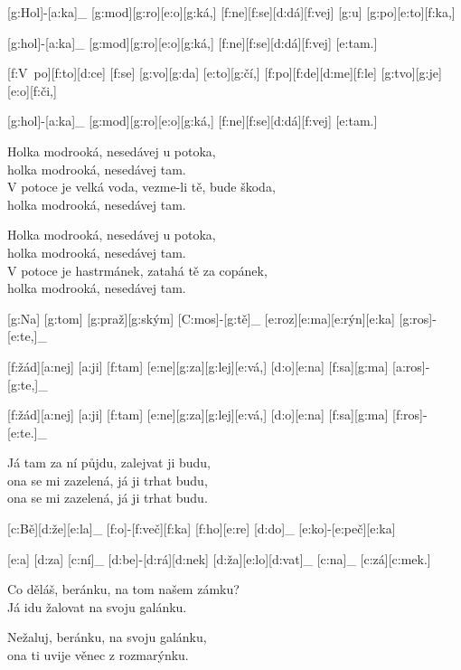 
[g:Hol]-[a:ka]_ [g:mod][g:ro][e:o][g:ká,] %
[f:ne][f:se][d:dá][f:vej] [g:u] [g:po][e:to][f:ka,]

[g:hol]-[a:ka]_ [g:mod][g:ro][e:o][g:ká,] %
[f:ne][f:se][d:dá][f:vej] [e:tam.]

[f:V~po][f:to][d:ce] [f:se] [g:vo][g:da] [e:to][g:čí,] %
[f:po][f:de][d:me][f:le] [g:tvo][g:je] [e:o][f:či,]

[g:hol]-[a:ka]_ [g:mod][g:ro][e:o][g:ká,] %
[f:ne][f:se][d:dá][f:vej] [e:tam.]

Holka modrooká, nesedávej u potoka,\\
holka modrooká, nesedávej tam.\\
V potoce je velká voda, vezme-li tě, bude škoda,\\
holka modrooká, nesedávej tam.

Holka modrooká, nesedávej u potoka,\\
holka modrooká, nesedávej tam.\\
V potoce je hastrmánek, zatahá tě za copánek,\\
holka modrooká, nesedávej tam.



[g:Na] [g:tom] [g:praž][g:ským] [C:mos]-[g:tě]_
[e:roz][e:ma][e:rýn][e:ka] [g:ros]-[e:te,]_

[f:žád][a:nej] [a:ji] [f:tam] [e:ne][g:za][g:lej][e:vá,] %
[d:o][e:na] [f:sa][g:ma] [a:ros]-[g:te,]_

[f:žád][a:nej] [a:ji] [f:tam] [e:ne][g:za][g:lej][e:vá,] %
[d:o][e:na] [f:sa][g:ma] [f:ros]-[e:te.]_

Já tam za ní půjdu, zalejvat ji budu,\\
ona se mi zazelená, já ji trhat budu,\\
ona se mi zazelená, já ji trhat budu.



[c:Bě][d:že][e:la]_ [f:o]-[f:več][f:ka] %
[f:ho][e:re] [d:do]_ [e:ko]-[e:peč][e:ka]

[e:a] [d:za] [c:ní]_ [d:be]-[d:rá][d:nek] %
[d:ža][e:lo][d:vat]_ [c:na]_ [c:zá][c:mek.]

Co děláš, beránku, na tom našem zámku?\\
Já idu žalovat na svoju galánku.

Nežaluj, beránku, na svoju galánku,\\
ona ti uvije věnec z rozmarýnku.



